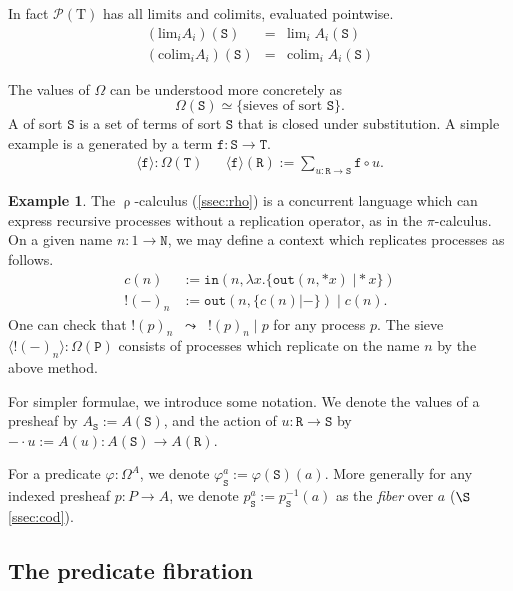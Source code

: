 \documentclass[conference]{IEEEtran}
\theoremstyle{definition}
\newtheorem{example}[theorem]{Example}
\newcommand{\define}[1]{{\bf \boldmath{#1}}}
\newcommand{\msc}[1]{\mathscr{#1}}
\newcommand{\mrm}[1]{\mathrm{#1}}
\newcommand{\mtt}[1]{\mathtt{#1}}
\newcommand{\T}{\mrm{T}}
\newcommand{\pow}{\msc{P}}
\newcommand{\ttr}{\mtt{R}}
\newcommand{\tts}{\mtt{S}}
\newcommand{\ttt}{\mtt{T}}
\newcommand{\ttf}{\mtt{f}}
\newcommand{\N}{\mtt{N}}
\newcommand{\PP}{\mtt{P}}
\newcommand{\tto}{\mtt{out}}
\newcommand{\tti}{\mtt{in}}
\begin{document}
        
In fact $\pow(\T)$ has all limits and colimits, evaluated pointwise.
\[\begin{array}{rcl}
    (\mrm{lim}_i A_i)(\tts) & = & \mrm{lim}_i \; A_i(\tts) \\
    (\mrm{colim}_i A_i)(\tts) & = & \mrm{colim}_i \; A_i(\tts)
\end{array}\]

The values of $\Omega$ can be understood more concretely as
\[\Omega(\tts) \simeq \{\text{sieves of sort } \tts\}.\]
A \define{sieve} of sort $\tts$ is a set of terms of sort $\tts$ that is closed under substitution. A simple example is a \define{principal sieve} generated by a term $\ttf:\tts\to\ttt$.
\begin{eqnarray}
\label{eq:sieve}
    \langle \ttf\rangle:\Omega(\ttt) &&
    \langle \ttf\rangle(\ttr):= \sum_{u:\ttr\to\tts}\ttf\circ u.
\end{eqnarray}

\begin{example}
    The $\uprho$-calculus (\ref{ssec:rho}) is a concurrent language which can express recursive processes without a replication operator, as in the $\pi$-calculus. On a given name $n:1\to \N$, we may define a context which replicates processes as follows.
    \[\begin{array}{ll}
    c(n)& := \tti(n, \lambda x.\{\tto(n,\ast x) \; \vert \ast x \} ) \\
    !(-)_n & := \tto(n,\{c(n)\vert -\}) \; \vert \; c(n).
    \end{array}\]
One can check that $!(p)_n \;\; \leadsto \;\; !(p)_n \; \vert \; p$ for any process $p$.
The sieve $\langle!(-)_n\rangle:\Omega(\PP)$ consists of processes which replicate on the name $n$ by the above method.
\end{example}

For simpler formulae, we introduce some notation. We denote the values of a presheaf by $A_\tts := A(\tts)$, and the action of $u:\ttr\to \tts$ by $-\cdot u:= A(u): A(\tts)\to A(\ttr)$.

For a predicate $\varphi:\Omega^A$, we denote $\varphi_\tts^a := \varphi(\tts)(a)$. More generally for any indexed presheaf $p:P\to A$, we denote $p_\tts^a:=p_\tts^{-1}(a)$ as the \textit{fiber} over $a$ ($\S$\ref{ssec:cod}).

\subsection{The predicate fibration}
\label{ssec:sub}
\end{document}
